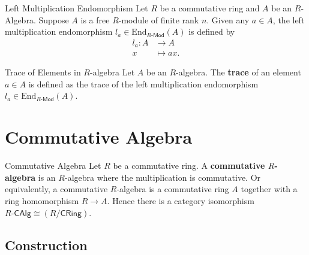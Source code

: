 \begin{example}{Left Multiplication Endomorphism}{}
    Let $R$ be a commutative ring and $A$ be an $R$-Algebra. Suppose $A$ is a free $R$-module of finite rank $n$. Given any $a\in A$, the left multiplication endomorphism $l_a\in\mathrm{End}_{R\text{-}\mathsf{Mod}}(A)$ is defined by
    \begin{align*}
        l_a:A &\longrightarrow A\\
        x &\longmapsto ax.
    \end{align*}
\end{example}


\begin{definition}{Trace of Elements in $R$-algebra}{}
    Let $A$ be an $R$-algebra. The \textbf{trace} of an element $a\in A$ is defined as the trace of the left multiplication endomorphism $l_a\in\mathrm{End}_{R\text{-}\mathsf{Mod}}(A)$.
\end{definition}




\section{Commutative Algebra}
\begin{definition}{Commutative Algebra}{}
    Let $R$ be a commutative ring. A \textbf{commutative $R$-algebra} is an $R$-algebra where the multiplication is commutative. Or equivalently, a commutative $R$-algebra is a commutative ring $A$ together with a ring homomorphism $R\to A$. Hence there is a category isomorphism $R\text{-}\mathsf{CAlg}\cong \left(R/\mathsf{CRing}\right)$.
\end{definition}

\subsection{Construction}


